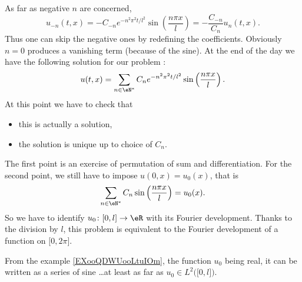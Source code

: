As far as negative \( n\) are concerned,
\begin{equation}
    u_{-n}(t,x)=-C_{-n} e^{-n^2\pi^2 t/l^2}\sin\left( \frac{ n\pi x }{ l } \right)=-\frac{ C_{-n} }{C_n  }u_n(t,x).
\end{equation}
Thus one can skip the negative ones by redefining the coefficients. Obviously \( n=0\) produces a vanishing term (because of the sine). At the end of the day we have the following solution for our problem :
\begin{equation}
    u(t,x)=\sum_{n\in \eN^*}C_n e^{-n^2\pi^2 t/l^2}\sin\left( \frac{ n\pi x }{ l } \right).
\end{equation}
At this point we have to check that
\begin{itemize}
    \item this is actually a solution,
    \item the solution is unique up to choice of \( C_n\).
\end{itemize}
The first point is an exercise of permutation of sum and differentiation. For the second point, we still have to impose \( u(0,x)=u_0(x)\), that is
\begin{equation}
    \sum_{n\in \eN^*}C_n\sin\left( \frac{ n\pi x }{ l } \right)=u_0(x).
\end{equation}
So we have to identify \( u_0\colon  \mathopen[ 0 , l \mathclose]\to \eR \) with its Fourier development. Thanks to the division by \( l\), this problem is equivalent to the Fourier development of a function on \( \mathopen[ 0 , 2\pi \mathclose]\).

From the example \ref{EXooQDWUooLtuIOm}, the function \( u_0\) being real, it can be written as a series of sine \ldots at least as far as \( u_0\in L^2\big( \mathopen[ 0 , l \mathclose] \big)\).
